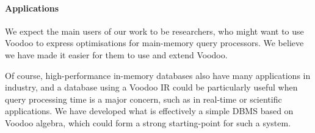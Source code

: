 \paragraph{Applications}

We expect the main users of our work to be researchers, who might want to use Voodoo to express optimisations for main-memory query processors. We believe we have made it easier for them to use and extend Voodoo.

Of course, high-performance in-memory databases also have many applications in industry, and a database using a Voodoo IR could be particularly useful when query processing time is a major concern, such as in real-time or scientific applications. We have developed what is effectively a simple DBMS based on Voodoo algebra, which could form a strong starting-point for such a system.

